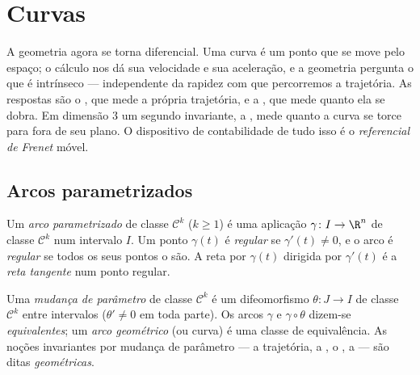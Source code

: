 \chapter{Curvas}\label{ch:b2:curves}

A geometria agora se torna diferencial. Uma curva é um ponto que se move pelo
espaço; o cálculo nos dá sua velocidade e sua aceleração, e a geometria
pergunta o que é intrínseco --- independente da rapidez com que percorremos a
trajetória. As respostas são o \emph{}, que mede a
própria trajetória, e a \emph{}, que mede quanto ela
se dobra. Em dimensão $3$ um segundo invariante, a \emph{},
mede quanto a curva se torce para fora de seu plano. O dispositivo de
contabilidade de tudo isso é o \emph{referencial de Frenet} móvel.

\section{Arcos parametrizados}

\begin{definition}\label{def:b2:curves:arc}
Um \emph{arco parametrizado} de classe
$\mathcal{C}^k$ ($k \geq 1$) é
uma aplicação $\gamma \colon I \to \R^n$ de classe $\mathcal{C}^k$ num
intervalo $I$. Um ponto $\gamma(t)$ é \emph{regular} se
$\gamma'(t) \neq 0$, e o arco é \emph{regular} se todos os seus
pontos o são. A reta por $\gamma(t)$ dirigida por $\gamma'(t)$
é a \emph{reta tangente} num ponto regular.
\end{definition}

\begin{definition}\label{def:b2:curves:reparam}
Uma \emph{mudança de parâmetro} de classe
$\mathcal{C}^k$ é um
difeomorfismo $\theta \colon J \to I$ de classe $\mathcal{C}^k$ entre
intervalos ($\theta' \neq 0$ em toda parte). Os arcos $\gamma$ e
$\gamma \circ \theta$ dizem-se \emph{equivalentes}; um
\emph{arco geométrico} (ou curva) é uma
classe de equivalência. As noções
invariantes por mudança de parâmetro --- a trajetória, a , o , a  --- são ditas \emph{geométricas}.
\end{definition}

